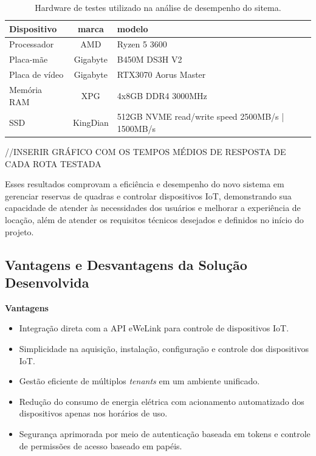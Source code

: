 \begin{table}[htb]
	\centering
	\caption{\label{tab:hardware_teste_local}Hardware de testes utilizado na análise de desempenho do sitema.}	
	\begin{tabular}{|l|c|p{6cm}|}
		\hline
		\textbf{Dispositivo} & \textbf{marca} & \textbf{modelo} \\ \hline
    Processador & AMD & Ryzen 5 3600 \\ \hline
    Placa-mãe & Gigabyte & B450M DS3H V2 \\ \hline
    Placa de vídeo & Gigabyte & RTX3070 Aorus Master \\ \hline
    Memória RAM & XPG & 4x8GB DDR4 3000MHz \\ \hline
    SSD & KingDian & 512GB NVME read/write speed 2500MB/s | 1500MB/s\\ \hline
	\end{tabular}
\end{table}

//INSERIR GRÁFICO  COM OS TEMPOS MÉDIOS DE RESPOSTA DE CADA ROTA TESTADA

Esses resultados comprovam a eficiência e desempenho do novo sistema em gerenciar reservas de quadras e controlar dispositivos IoT, demonstrando sua capacidade de atender às necessidades dos usuários e melhorar a experiência de locação, além de atender os requisitos técnicos desejados e definidos no início do projeto.

\subsection{Vantagens e Desvantagens da Solução Desenvolvida}

\textbf{Vantagens}\\
\begin{itemize}
    \item Integração direta com a API eWeLink para controle de dispositivos IoT.
    \item Simplicidade na aquisição, instalação, configuração e controle dos dispositivos IoT. 
    \item Gestão eficiente de múltiplos \textit{tenants} em um ambiente unificado.
    \item Redução do consumo de energia elétrica com acionamento automatizado dos dispositivos apenas nos horários de uso.
    \item Segurança aprimorada por meio de autenticação baseada em tokens e controle de permissões de acesso baseado em papéis.
\end{itemize}

